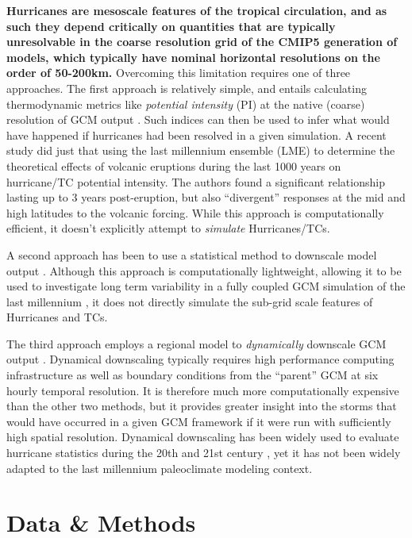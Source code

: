 \documentclass[phd,tocprelim]{cornell}
\begin{document}
\textbf{Hurricanes are mesoscale features of the tropical circulation,
  and as such they depend critically on quantities that are typically
  unresolvable in the coarse resolution grid of the CMIP5 generation
  of models, which typically have nominal horizontal resolutions on
  the order of 50-200km.} Overcoming this limitation requires one of
three approaches. The first approach is relatively simple, and entails
calculating thermodynamic metrics like \textit{potential intensity}
(PI) at the native (coarse) resolution of GCM output
\cite{wang,ke_nolan,tang,bister2002}. Such indices can then be used to 
infer what would have happened if hurricanes had been resolved in a given
simulation. A recent study \cite{yan2018divergent} 
did just that using the
last millennium ensemble (LME) to determine the theoretical effects of
volcanic eruptions during the last 1000 years on hurricane/TC
potential intensity. The authors found a significant relationship
lasting up to 3 years post-eruption, but also ``divergent'' responses
at the mid and high latitudes to the volcanic forcing. While this
approach is computationally efficient, it doesn't explicitly attempt
to \textit{simulate} Hurricanes/TCs.

A second approach has been to use a statistical method to downscale
model output \cite{down_method_ke,cam_down_ke}. Although this approach
is computationally lightweight, allowing it to be used to investigate
long term variability in a fully coupled GCM simulation of the last
millennium \cite{lme_down_ke}, it does not directly simulate the
sub-grid scale features of Hurricanes and TCs.

The third approach employs a regional model to \textit{dynamically}
downscale GCM output \cite{down_21st_gv}. Dynamical
downscaling typically requires high performance computing
infrastructure as well as boundary conditions from the ``parent'' GCM
at six hourly temporal resolution. It is therefore much more
computationally expensive than the other two methods, but it provides
greater insight into the storms that would have occurred in a given
GCM framework if it were run with sufficiently high spatial
resolution. Dynamical downscaling has been widely used to evaluate
hurricane statistics during the 20th and 21st century \cite{emanuel12219}, yet
it has not been widely adapted to the last millennium paleoclimate
modeling context.

\section{Data \& Methods}\label{methods}
\end{document}
